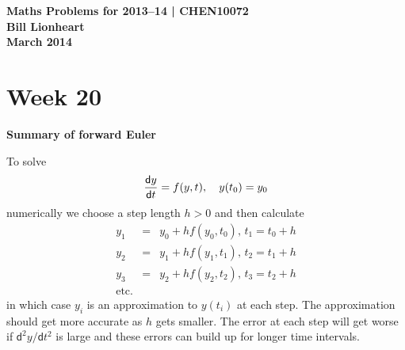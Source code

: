 \documentclass[11pt,a4paper]{article}
\newcommand{\dif}{\mathsf{d}}
\begin{document}
\begin{center} 
{\bf Maths Problems for 2013--14 | CHEN10072 \\
Bill Lionheart\\
 March 2014}
\end{center}



\section*{Week 20}



 
{\bf Summary of forward Euler}

To solve $$
{\dif y\over \dif t} = f(y,t),\quad y(t_0)=y_0
$$
numerically we choose a step length $h>0$ and then calculate
\begin{eqnarray*}
y_1 &=& y_0 + h f(y_0,t_0),\, t_1=t_0 +h \\
y_2 &=& y_1 + h f(y_1,t_1),\, t_2=t_1 +h \\
y_3 &=& y_2 + h f(y_2,t_2),\, t_3=t_2 +h \\
\mbox{etc.}
\end{eqnarray*}
in which case $y_i$ is an approximation  to $y(t_i)$ at each step. The approximation should get more accurate as $h$ gets smaller. The error at each step will get worse if $\dif^2 y/ \dif t^2$ is large and these errors can build up for longer time intervals.
 
\end{document}
